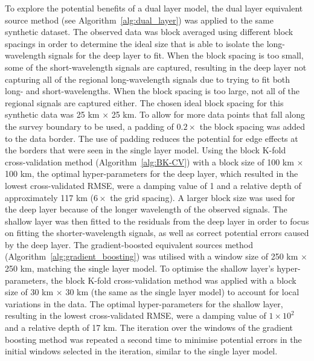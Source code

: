 To explore the potential benefits of a dual layer model, the dual layer equivalent source method (see Algorithm~\ref{alg:dual_layer}) was applied to the same synthetic dataset. The observed data was block averaged using different block spacings in order to determine the ideal size that is able to isolate the long-wavelength signals for the deep layer to fit. When the block spacing is too small, some of the short-wavelength signals are captured, resulting in the deep layer not capturing all of the regional long-wavelength signals due to trying to fit both long- and short-wavelengths. When the block spacing is too large, not all of the regional signals are captured either. The chosen ideal block spacing for this synthetic data was 25 km $\times$ 25 km. To allow for more data points that fall along the survey boundary to be used, a padding of $0.2 \times $ the block spacing was added to the data border. The use of padding reduces the potential for edge effects at the borders that were seen in the single layer model. Using the block K-fold cross-validation method (Algorithm~\ref{alg:BK-CV}) with a block size of 100 km $\times$ 100 km, the optimal hyper-parameters for the deep layer, which resulted in the lowest cross-validated RMSE, were a damping value of 1 and a relative depth of approximately 117 km ($6 \times$ the grid spacing). A larger block size was used for the deep layer because of the longer wavelength of the observed signals. The shallow layer was then fitted to the residuals from the deep layer in order to focus on fitting the shorter-wavelength signals, as well as correct potential errors caused by the deep layer. The gradient-boosted equivalent sources method (Algorithm~\ref{alg:gradient_boosting}) was utilised with a window size of 250 km $\times$ 250 km, matching the single layer model. To optimise the shallow layer’s hyper-parameters, the block K-fold cross-validation method was applied with a block size of 30 km $\times$ 30 km (the same as the single layer model) to account for local variations in the data. The optimal hyper-parameters for the shallow layer, resulting in the lowest cross-validated RMSE, were a damping value of $1 \times 10^{2}$ and a relative depth of 17 km. The iteration over the windows of the gradient boosting method was repeated a second time to minimise potential errors in the initial windows selected in the iteration, similar to the single layer model. 

